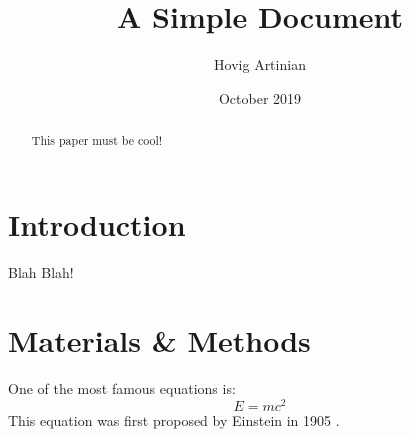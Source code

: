 \documentclass[12pt]{article}
\title{A Simple Document}
\author{Hovig Artinian}
\date{October 2019}
\begin{document}
    \maketitle

    \begin{abstract}
        This paper must be cool!
    \end{abstract}

    \section{Introduction}
    	Blah Blah!

    \section{Materials \& Methods}
    One of the most famous equations is:
    \begin{equation}
	    E =  mc^2
    \end{equation}
    This equation was first proposed by Einstein in 1905
    \cite{einstein1905does}.
    
    
    
\end{document}
